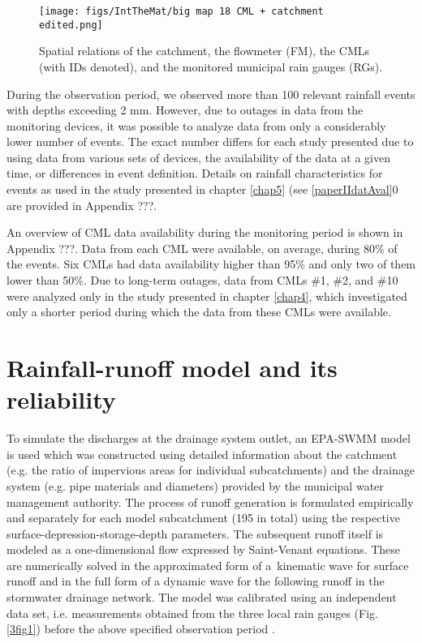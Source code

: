 \documentclass{ctuthesis}\usepackage[]{graphicx}\usepackage[]{color}
\begin{document}
\begin{figure}[p]
\begin{center}
\texttt{[image: figs/IntTheMat/big map 18 CML + catchment edited.png]}
\caption{ Spatial relations of the catchment, the flowmeter (FM), the CMLs (with IDs denoted), and the monitored municipal rain gauges (RGs).} \label{3fig2}
\end{center}
\end{figure}

During the observation period, we observed more than 100 relevant rainfall events with depths exceeding 2 mm. However, due to outages in data from the monitoring devices, it was possible to analyze data from only a considerably lower number of events. The exact number differs for each study presented due to using data from various sets of devices, the availability of the data at a given time, or differences in event definition. Details on rainfall characteristics for events as used in the study presented in chapter \ref{chap5} (see \ref{paperIIdatAval}0 are provided in Appendix ???.

An overview of CML data availability during the monitoring period is shown in Appendix ???. Data from each CML were available, on average, during 80\% of the events. Six CMLs had data availability higher than 95\% and only two of them lower than 50\%. Due to long-term outages, data from CMLs  \#1, \#2, and \#10 were analyzed only in the study presented in chapter \ref{chap4}, which investigated only a shorter period during which the data from these CMLs were available.


\section{Rainfall-runoff model and its reliability} \label{RRmodel}

To simulate the discharges at the drainage system outlet, an EPA-SWMM model is used which was constructed using detailed information about the catchment (e.g. the ratio of impervious areas for individual subcatchments) and the drainage system (e.g. pipe materials and diameters) provided by the municipal water management authority. The process of runoff generation is formulated empirically and separately for each model subcatchment (195 in total) using the respective surface-depression-storage-depth parameters. The subsequent runoff itself is modeled as a one-dimensional flow expressed by Saint-Venant equations. These are numerically solved in the approximated form of a~kinematic wave for surface runoff and in the full form of a dynamic wave for the following runoff in the stormwater drainage network. The model was calibrated using an independent data set, i.e. measurements obtained from the three local rain gauges (Fig. \ref{3fig1}) before the above specified observation period \citep{bakalarka}. 
\end{document}
